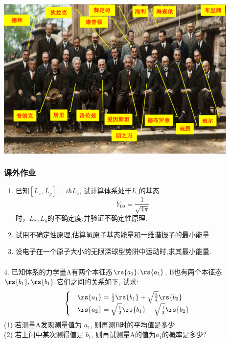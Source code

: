 \begin{frame} 
    \frametitle{}
    \includegraphics[width=0.9\textwidth]{figs/meet.png}
\end{frame} 

\begin{frame}
    \frametitle{课外作业}
    \begin{enumerate}
        \item 已知$[L_x, L_y]=i\hbar L_z$, 试计算体系处于$L_z$的基态 $$Y_{00}=\frac{1}{\sqrt{4\pi}}$$时，$L_x, L_y$的不确定度,并验证不确定性原理.
        \item 试用不确定性原理,估算氢原子基态能量和一维谐振子的最小能量
        \item 设电子在一个原子大小的无限深球型势阱中运动时,求其最小能量.
    \end{enumerate}
\end{frame}

\begin{frame}
    \frametitle{}
       4. 已知体系的力学量A有两个本征态$\rs{a_1}, \rs{a_1}$, B也有两个本征态$\rs{b_1}, \rs{b_1}$.它们之间的关系如下, 试求: \\
        \[ \begin{cases}
            &\rs{a_1} =\frac{1}{2} \rs{b_1} +  \sqrt{\frac{3}{4}} \rs{b_2} \\
            &\rs{a_2} =\sqrt{\frac{1}{2}} \rs{b_1} +  \sqrt{\frac{1}{2}} \rs{b_2} 
        \end{cases} \]
        (1) 若测量A发现测量值为 $a_1$, 则再测B时的平均值是多少\\
        (2) 若上问中某次测得值是 $b_1$, 则再试测量A的值为$a_1$的概率是多少?
\end{frame}


